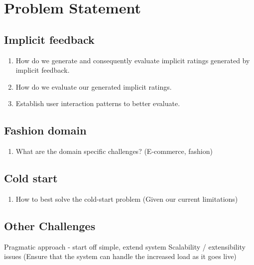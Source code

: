 \section{Problem Statement}

\subsection{Implicit feedback}
\begin{enumerate}
  \item How do we generate and consequently evaluate implicit ratings generated by implicit feedback.
  \item How do we evaluate our generated implicit ratings.
  \item Establish user interaction patterns to better evaluate.
\end{enumerate}

\subsection{Fashion domain}
\begin{enumerate}
  \item What are the domain specific challenges? (E-commerce, fashion)
\end{enumerate}

\subsection{Cold start}
\begin{enumerate}
  \item How to best solve the cold-start problem (Given our current limitations)
\end{enumerate}


\subsection{Other Challenges}
Pragmatic approach - start off simple, extend system
Scalability / extensibility issues (Ensure that the system can handle the increased load as it goes live)


